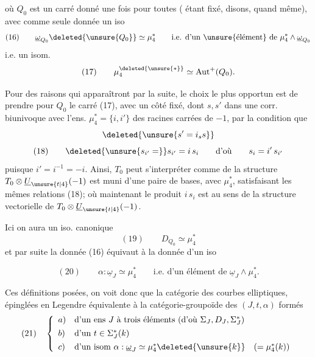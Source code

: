 
où $Q_0$ est un carré donné une fois pour toutes ( étant fixé, disons, quand même), avec comme seule donnée un iso
\[
(16)\qquad \underline{\omega}_{Q_0}\deleted{\unsure{Q_0}}\simeq\mu_4^* \qquad\text{i.e. d'un \unsure{élément} de }\mu_4^*\wedge\underline{\omega}_{Q_0}
\]
i.e. un isom.
\[
(17)\qquad \mu_4^{\deleted{\unsure{*}}}\simeq\operatorname{Aut}^{+}(Q_0).
\]

Pour des raisons qui apparaîtront par la suite, le choix le plus opportun est de prendre pour $Q_0$ le carré  (17), avec un côté fixé, dont  $s,s'$  dans une corr. biunivoque avec l'ens. $\mu_4^*=\{i,i'\}$ des racines carrées de $-1$, par la condition que
\[
\deleted{\unsure{s'=i_s s}}
\]
\[
(18)\qquad \deleted{\unsure{s_{i'}=}}s_{i'}=i\,s_i\qquad\text{d'où}\qquad s_i=i'\,s_{i'}
\]
puisque $i'=i^{-1}=-i$. Ainsi, $T_0$ peut s'interpréter comme  de la structure  $T_0\otimes\underline{U}_{\unsure{t|4}}(-1)$ est muni d'une paire de bases,  avec $\mu_4^*$, satisfaisant les mêmes relations (18); où maintenant le produit $i\,s_i$ est au sens de la structure vectorielle de $T_0\otimes\underline{U}_{\unsure{t|4}}(-1)$. 

Ici on aura un iso. canonique
\[
(19)\qquad D_{Q_0}\simeq\mu_4^*
\]
et par suite la donnée (16) équivaut à la donnée d'un iso

\[
(20)\qquad \alpha:\underline{\omega}_J\simeq\mu_4^*\qquad\text{i.e. d'un élément de }\underline{\omega}_J\wedge\mu_4^*.
\]

Ces définitions posées, on voit donc que la catégorie des courbes elliptiques, épinglées en Legendre  équivalente à la catégorie-groupoïde des  $(J,t,\alpha)$  formés
\[
(21)\quad\left\{\begin{array}{ll}
a)&\text{d'un ens }J\text{ à trois éléments (d'où }\Sigma_J,D_J,\Sigma_J^*\text{)}\\[4pt]
b)&\text{d'un }t\in\Sigma_J^*(k)\\[4pt]
c)&\text{d'un isom }\alpha:\underline{\omega}_J\simeq\mu_4^*\deleted{\unsure{k}}\quad(=\mu_4^*(k))
\end{array}\right.
\]

